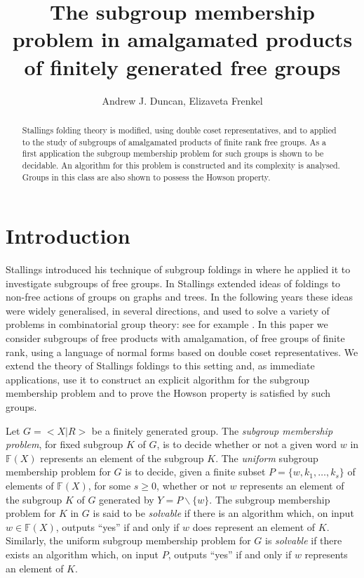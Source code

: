 \documentclass[a4paper,12pt]{article}
\title{The subgroup membership problem in amalgamated products of 
finitely generated free groups
}
\author{Andrew J. Duncan, Elizaveta Frenkel}
\numberwithin{equation}{section}
\numberwithin{figure}{section}
\newcommand{\FF}{\ensuremath{\mathbb{F}}}
\begin{document}
\maketitle

\begin{abstract}
Stallings folding theory is modified, using double coset representatives, and to applied
to the study of subgroups of  amalgamated
products of finite rank free groups. As  a first application the
 subgroup membership
problem for such groups is shown to be decidable. An algorithm for this
problem is constructed and its complexity is analysed. Groups in this
class are also shown to possess the Howson property. 
 \end{abstract}



\section{Introduction}\label{se:global_intro}

Stallings introduced his technique of subgroup foldings in
\cite{stallings83} where he applied it to investigate subgroups of
free groups. In \cite{stallings88} Stallings extended ideas of
foldings to non-free actions of groups on graphs and trees. In the following
years these ideas were widely generalised, in several
directions,  and used to solve a variety of  problems in
combinatorial group theory: see for example
\cite{befe,BoWei,KM02,SilvaWeil08}.
In this paper we consider  subgroups
of free products with amalgamation, of free groups of finite rank, using
a language of normal forms based on double coset representatives.  We
extend the theory  of Stallings foldings to this setting and, as immediate
applications,  use it to construct an
explicit algorithm for the subgroup membership problem and to prove the 
Howson property is satisfied by such groups.

Let $G = <X|R>$ be a finitely generated group.
The \emph{subgroup  membership problem}, for  fixed subgroup $K$ of $G$,
is to decide whether or not a given  word $w$ in $\FF(X)$ represents an element of  the subgroup $K$.
The \emph{uniform} subgroup membership problem for $G$ is to decide,
given a finite subset $P=\{w,k_1,\ldots ,k_s\}$ of elements of $\FF(X)$,
for some $s\ge 0$,
whether or not $w$ represents an element of  the subgroup $K$ of $G$
generated by $Y=P\backslash\{w\}$.
The  subgroup membership problem for $K$ in $G$ is said to be
\emph{solvable} if there is an algorithm which, on input $w\in \FF(X)$,
outputs ``yes'' if and only if $w$ does represent an element of $K$.
Similarly, the uniform subgroup membership problem for $G$ is \emph{solvable}
if there exists an algorithm which, on input $P$, outputs ``yes'' if
and only if $w$ represents an element of $K$.
\end{document}
